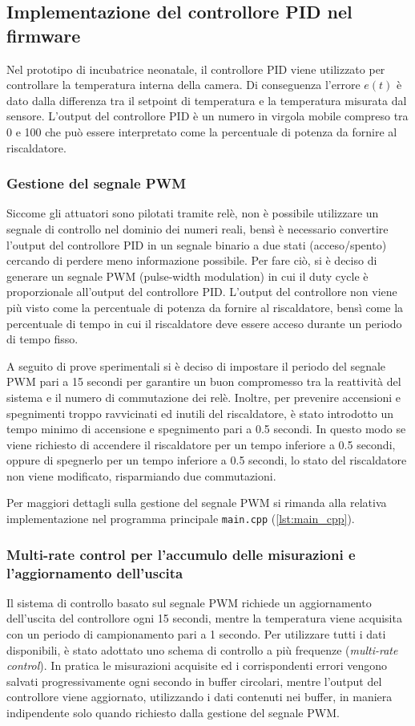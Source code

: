 \subsection{Implementazione del controllore PID nel firmware}
Nel prototipo di incubatrice neonatale, il controllore PID viene utilizzato per controllare la temperatura interna della
camera. Di conseguenza l'errore \(e(t)\) è dato dalla differenza tra il setpoint di temperatura e la temperatura misurata
dal sensore. L'output del controllore PID è un numero in virgola mobile compreso tra 0 e 100 che può essere interpretato
come la percentuale di potenza da fornire al riscaldatore.

\subsubsection{Gestione del segnale PWM}
Siccome gli attuatori sono pilotati tramite relè, non è possibile utilizzare un segnale di controllo nel dominio dei
numeri reali, bensì è necessario convertire l'output del controllore PID in un segnale binario a due stati (acceso/spento)
cercando di perdere meno informazione possibile. Per fare ciò, si è deciso di generare un segnale PWM (pulse-width modulation)
in cui il duty cycle è proporzionale all'output del controllore PID. L'output del controllore non viene più visto come la
percentuale di potenza da fornire al riscaldatore, bensì come la percentuale di tempo in cui il riscaldatore deve essere
acceso durante un periodo di tempo fisso.

A seguito di prove sperimentali si è deciso di impostare il periodo del segnale PWM pari a 15 secondi per garantire un
buon compromesso tra la reattività del sistema e il numero di commutazione dei relè. Inoltre, per prevenire accensioni
e spegnimenti troppo ravvicinati ed inutili del riscaldatore, è stato introdotto un tempo minimo di accensione e spegnimento
pari a 0.5 secondi. In questo modo se viene richiesto di accendere il riscaldatore per un tempo inferiore a 0.5 secondi,
oppure di spegnerlo per un tempo inferiore a 0.5 secondi, lo stato del riscaldatore non viene modificato, risparmiando
due commutazioni.

Per maggiori dettagli sulla gestione del segnale PWM si rimanda alla relativa implementazione nel programma principale
\verb|main.cpp| (\autoref{lst:main_cpp}).

\subsubsection{Multi-rate control per l'accumulo delle misurazioni e l'aggiornamento dell'uscita}
Il sistema di controllo basato sul segnale PWM richiede un aggiornamento dell'uscita del controllore ogni 15 secondi, mentre
la temperatura viene acquisita con un periodo di campionamento pari a 1 secondo. Per utilizzare tutti i dati disponibili,
è stato adottato uno schema di controllo a più frequenze (\textit{multi-rate control}). In pratica le misurazioni acquisite
ed i corrispondenti errori vengono salvati progressivamente ogni secondo in buffer circolari, mentre l'output del controllore
viene aggiornato, utilizzando i dati contenuti nei buffer, in maniera indipendente solo quando richiesto dalla gestione del
segnale PWM.

